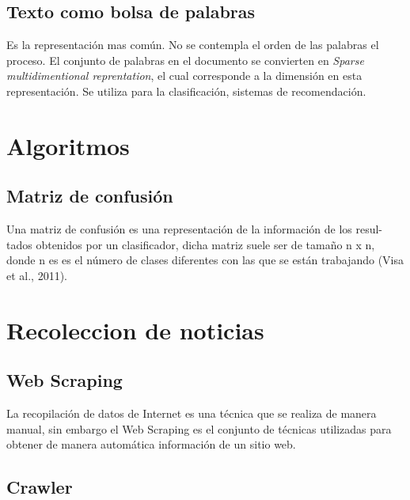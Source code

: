\subsection{Texto como bolsa de palabras}
    Es la representación mas común. No se contempla el orden de las palabras el proceso. El conjunto de palabras en el documento se convierten en 
    \textit{Sparse multidimentional reprentation}, el cual corresponde a la dimensión en esta representación. Se utiliza para la clasificación, 
    sistemas de recomendación.

\section{Algoritmos}



\subsection{Matriz de confusión}
    Una matriz de confusión es una representación de la información de los resul-
    tados obtenidos por un clasificador, dicha matriz suele ser de tamaño n x n,
    donde n es es el número de clases diferentes con las que se están trabajando
    (Visa et al., 2011).



\section{Recoleccion de noticias}

\subsection{Web Scraping}
    La recopilación de datos de Internet es una técnica que se realiza de manera
    manual, sin embargo el Web Scraping es el conjunto de técnicas utilizadas
    para obtener de manera automática información de un sitio web.


\subsection{Crawler}
